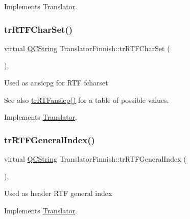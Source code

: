 Implements \mbox{\hyperlink{class_translator_a9953a4c0e6a4fc7d017abcd5c2939e0f}{Translator}}.

\mbox{\label{class_translator_finnish_a3ec8f8f418f66bbfbbdda735447cf12d}} 
\subsubsection{\texorpdfstring{trRTFCharSet()}{trRTFCharSet()}}
{\footnotesize\ttfamily virtual \mbox{\hyperlink{class_q_c_string}{Q\+C\+String}} Translator\+Finnish\+::tr\+R\+T\+F\+Char\+Set (\begin{DoxyParamCaption}{ }\end{DoxyParamCaption})\hspace{0.3cm}{\ttfamily [inline]}, {\ttfamily [virtual]}}

Used as ansicpg for R\+TF fcharset \begin{DoxySeeAlso}{See also}
\mbox{\hyperlink{class_translator_finnish_ac423c0b2f218db44410075122cc3e338}{tr\+R\+T\+Fansicp()}} for a table of possible values. 
\end{DoxySeeAlso}


Implements \mbox{\hyperlink{class_translator_afad391f3cbfb5ce6332b7239f8e2049a}{Translator}}.

\mbox{\label{class_translator_finnish_a0d8409f7f6da3e01a3a3ffaa81d2fdaf}} 
\subsubsection{\texorpdfstring{trRTFGeneralIndex()}{trRTFGeneralIndex()}}
{\footnotesize\ttfamily virtual \mbox{\hyperlink{class_q_c_string}{Q\+C\+String}} Translator\+Finnish\+::tr\+R\+T\+F\+General\+Index (\begin{DoxyParamCaption}{ }\end{DoxyParamCaption})\hspace{0.3cm}{\ttfamily [inline]}, {\ttfamily [virtual]}}

Used as header R\+TF general index 

Implements \mbox{\hyperlink{class_translator}{Translator}}.

